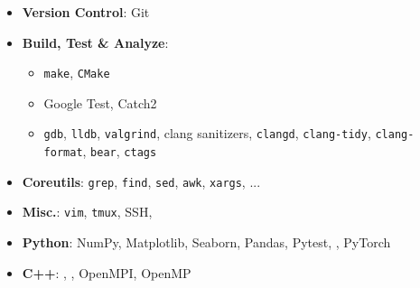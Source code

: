 \twocolumnsection
{
\begin{skills}
\end{skills}}
{
\vspace{1em}
\begin{itemize}
  \item \textbf{Version Control}: Git
  \item \textbf{Build, Test \& Analyze}:
    \begin{itemize}
      \item \texttt{make}, \texttt{CMake}
      \item Google Test, Catch2
      \item \texttt{gdb}, \texttt{lldb}, \texttt{valgrind}, clang sanitizers, \texttt{clangd}, \texttt{clang-tidy}, \texttt{clang-format}, \texttt{bear}, \texttt{ctags}
    \end{itemize}
  \item \textbf{Coreutils}: \texttt{grep}, \texttt{find}, \texttt{sed}, \texttt{awk}, \texttt{xargs}, ...
  \item \textbf{Misc.}: \texttt{vim}, \texttt{tmux}, SSH,
\end{itemize}}

\vspace{10pt}

{
  \vspace{1em}
  \begin{itemize}
    \item \textbf{Python}: NumPy, Matplotlib, Seaborn, Pandas, Pytest, , PyTorch
    \item \textbf{C++}: , , OpenMPI, OpenMP
  \end{itemize}
  }

